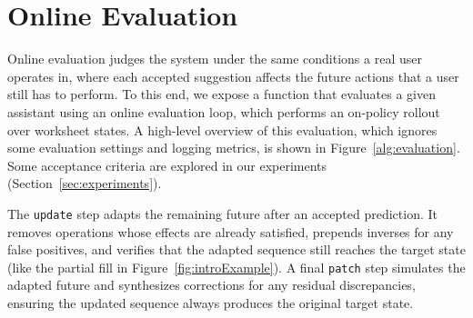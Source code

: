 \documentclass{article}
\theoremstyle{plain}
\theoremstyle{definition}
\theoremstyle{remark}
\begin{document}
\section{Online Evaluation}
\label{sec:online_eval}

Online evaluation judges the system under the same conditions a real user operates in, where each accepted suggestion affects the future actions that a user still has to perform.
To this end, we expose a function that evaluates a given assistant using an online evaluation loop, which performs an on-policy rollout over worksheet states.
A high-level overview of this evaluation, which ignores some evaluation settings and logging metrics, is shown in Figure~\ref{alg:evaluation}.
Some acceptance criteria are explored in our experiments (Section~\ref{sec:experiments}).

The \texttt{update} step adapts the remaining future after an accepted prediction. It removes operations whose effects are already satisfied, prepends inverses for any false positives, and verifies that the adapted sequence still reaches the target state (like the partial \textsf{\small fill} in Figure~\ref{fig:introExample}).
A final \texttt{patch} step simulates the adapted future and synthesizes corrections for any residual discrepancies, ensuring the updated sequence always produces the original target state.
\end{document}
